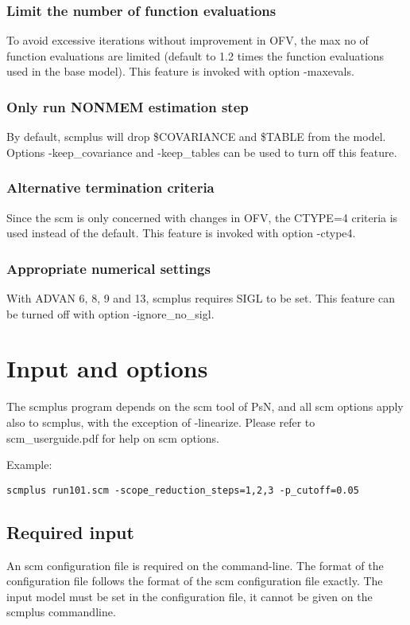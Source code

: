 \documentclass[hideglossary,notoc,hidelof,hidelot,hideTheSignaturePage,hideLinkCurrent,hideloa,pdfLatex,noClient,notitle,hideConfidential]{PMXstyle-20170118kajsa4}
\begin{document}
\subsubsection{Limit the number of function evaluations}
To avoid excessive
iterations without improvement in OFV, the max no of function
evaluations are limited (default to 1.2 times the function evaluations
used in the base model). This feature is invoked with option -maxevals.
\subsubsection{Only run NONMEM estimation step}
By default, scmplus will drop \$COVARIANCE and \$TABLE from the model.
Options -keep\_covariance and -keep\_tables can be used to turn off this feature.
\subsubsection{Alternative termination criteria}
Since the scm is only concerned with
changes in OFV, the CTYPE=4 criteria is used instead of the default.
This feature is invoked with option -ctype4.
\subsubsection{Appropriate numerical settings}
With ADVAN 6, 8, 9 and 13, scmplus requires SIGL to be set.
This feature can be turned off with option -ignore\_no\_sigl.


\section{Input and options}

The scmplus program depends on the scm tool of PsN, and all scm options apply also to scmplus,
with the exception of -linearize.
Please refer to scm\_userguide.pdf for help on scm options.

Example:
\begin{verbatim}
scmplus run101.scm -scope_reduction_steps=1,2,3 -p_cutoff=0.05
\end{verbatim}

\subsection{Required input}
An scm configuration file is required on the command-line. The format of the configuration file follows the format of 
the scm configuration file exactly. 
The input model must be set in the configuration file, it cannot be given on the scmplus commandline. 
\end{document}
